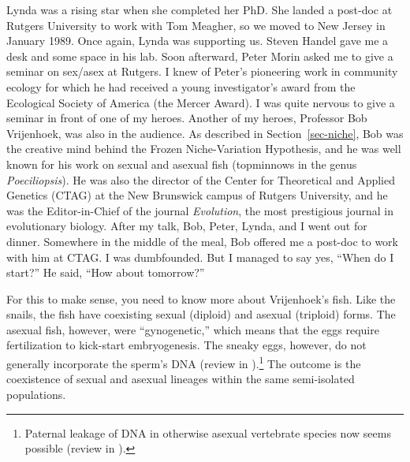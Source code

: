 \documentclass[
  letterpaper,
]{book}
\begin{document}
Lynda was a rising star when she completed her PhD. She landed a
post-doc at Rutgers University to work with Tom Meagher, so we moved to
New Jersey in January 1989. Once again, Lynda was supporting us. Steven
Handel gave me a desk and some space in his lab. Soon afterward, Peter
Morin asked me to give a seminar on sex/asex at Rutgers. I knew of
Peter's pioneering work in community ecology for which he had received a
young investigator's award from the Ecological Society of America (the
Mercer Award). I was quite nervous to give a seminar in front of one of
my heroes. Another of my heroes, Professor Bob Vrijenhoek, was also in
the audience. As described in Section~\ref{sec-niche}, Bob was the
creative mind behind the Frozen Niche-Variation Hypothesis, and he was
well known for his work on sexual and asexual fish (topminnows in the
genus \emph{Poeciliopsis}). He was also the director of the Center for
Theoretical and Applied Genetics (CTAG) at the New Brunswick campus of
Rutgers University, and he was the Editor-in-Chief of the journal
\emph{Evolution}, the most prestigious journal in evolutionary biology.
After my talk, Bob, Peter, Lynda, and I went out for dinner. Somewhere
in the middle of the meal, Bob offered me a post-doc to work with him at
CTAG. I was dumbfounded. But I managed to say yes, ``When do I start?''
He said, ``How about tomorrow?''

For this to make sense, you need to know more about Vrijenhoek's fish.
Like the snails, the fish have coexisting sexual (diploid) and asexual
(triploid) forms. The asexual fish, however, were ``gynogenetic,'' which
means that the eggs require fertilization to kick-start embryogenesis.
The sneaky eggs, however, do not generally incorporate the sperm's DNA
(review in ).\footnote{Paternal
  leakage of DNA in otherwise asexual vertebrate species now seems
  possible (review in ).} The outcome is the coexistence of sexual and asexual lineages
within the same semi-isolated populations.
\end{document}
